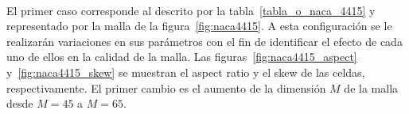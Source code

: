 \documentclass[letterpaper, openright, 12pt]{book}
\begin{document}
    \paragraph*{}
    El primer caso corresponde al descrito por la tabla~\ref{tabla_o_naca_4415}
    y representado por la malla de la figura~\ref{fig:naca4415}. A esta
    configuración se le realizarán variaciones en sus parámetros con el fin de
    identificar el efecto de cada uno de ellos en la calidad de la malla. Las
    figuras~\ref{fig:naca4415_aspect} y~\ref{fig:naca4415_skew} se muestran el
    aspect ratio y el skew de las celdas, respectivamente. El primer cambio es
    el aumento de la dimensión $M$ de la malla desde $M=45$ a $M=65$.

    \begin{figure}[htbp!]
        \centering



\end{figure}
\end{document}
